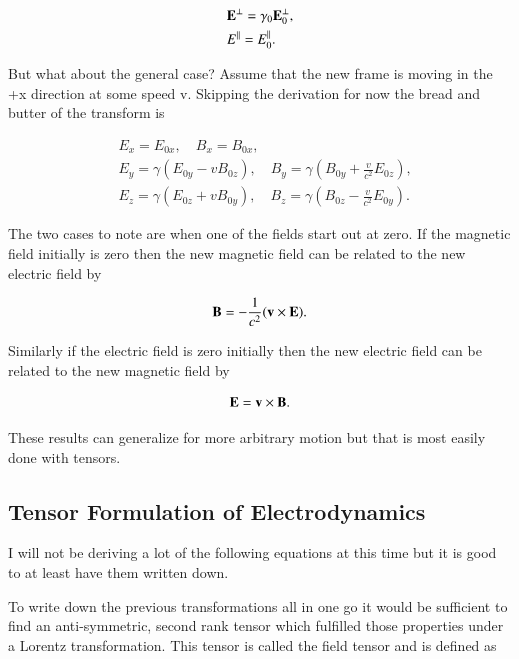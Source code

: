 \documentclass[preprint, review,12pt]{elsarticle}
\def\x{\times}
\def\b{\textbf}
\def\9{\left(}
\def\0{\right)}
\begin{document}
\begin{equation}
\begin{split}
    & \b E^\bot = \gamma_0 \b E_0^\bot, \\
    & E^\parallel = E_0^\parallel. 
\end{split}
\end{equation}

But what about the general case? Assume that the new frame is moving in the +x direction at some speed v. Skipping the derivation for now the bread and butter of the transform is

\begin{equation}
\begin{split}
    & E_x = E_{0x}, \quad B_x = B_{0x}, \\
    & E_y = \gamma(E_{0y} - v B_{0z}), \quad B_y = \gamma \9 B_{0y} + \frac{v}{c^2} E_{0z} \0, \\
    & E_z = \gamma(E_{0z} + v B_{0y}), \quad B_z = \gamma \9 B_{0z} - \frac{v}{c^2}E_{0y} \0.
\end{split}
\end{equation}

The two cases to note are when one of the fields start out at zero. If the magnetic field initially is zero then the new magnetic field can be related to the new electric field by

\begin{equation}
    \b B = -\frac{1}{c^2} (\b v \x \b E).
\end{equation}

Similarly if the electric field is zero initially then the new electric field can be related to the new magnetic field by

\begin{equation}
    \b E = \b v \x \b B.
\end{equation}

These results can generalize for more arbitrary motion but that is most easily done with tensors.

\subsection{Tensor Formulation of Electrodynamics}

I will not be deriving a lot of the following equations at this time but it is good to at least have them written down.

To write down the previous transformations all in one go it would be sufficient to find an anti-symmetric, second rank tensor which fulfilled those properties under a Lorentz transformation. This tensor is called the field tensor and is defined as
\end{document}
